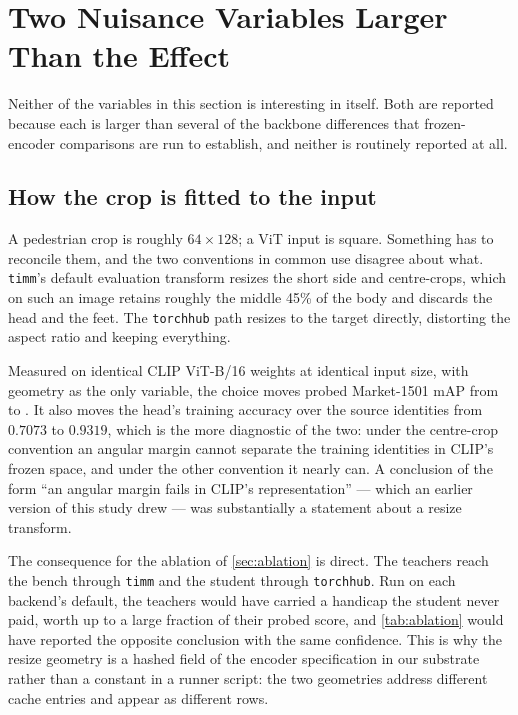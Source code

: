 \section{Two Nuisance Variables Larger Than the Effect}\label{sec:geometry}
Neither of the variables in this section is interesting in itself. Both are reported because
each is larger than several of the backbone differences that frozen-encoder comparisons are run
to establish, and neither is routinely reported at all.

\subsection{How the crop is fitted to the input}
A pedestrian crop is roughly $64\times128$; a ViT input is square. Something has to reconcile
them, and the two conventions in common use disagree about what. \texttt{timm}'s default
evaluation transform resizes the short side and centre-crops, which on such an image retains
roughly the middle 45\% of the body and discards the head and the feet. The
\texttt{torchhub} path resizes to the target directly, distorting the aspect ratio and keeping
everything.

Measured on identical CLIP ViT-B/16 weights at identical input size, with geometry as the only
variable, the choice moves probed Market-1501 mAP from \clipcropMarket{} to \clipMarket{}. It
also moves the head's training accuracy over the source identities from $0.7073$ to $0.9319$,
which is the more diagnostic of the two: under the centre-crop convention an angular margin
cannot separate the training identities in CLIP's frozen space, and under the other convention
it nearly can. A conclusion of the form ``an angular margin fails in CLIP's representation''
--- which an earlier version of this study drew --- was substantially a statement about a
resize transform.

The consequence for the ablation of \cref{sec:ablation} is direct. The teachers reach the bench
through \texttt{timm} and the student through \texttt{torchhub}. Run on each backend's default,
the teachers would have carried a handicap the student never paid, worth up to a large fraction
of their probed score, and \cref{tab:ablation} would have reported the opposite conclusion with
the same confidence. This is why the resize geometry is a hashed field of the encoder
specification in our substrate rather than a constant in a runner script: the two geometries
address different cache entries and appear as different rows.

